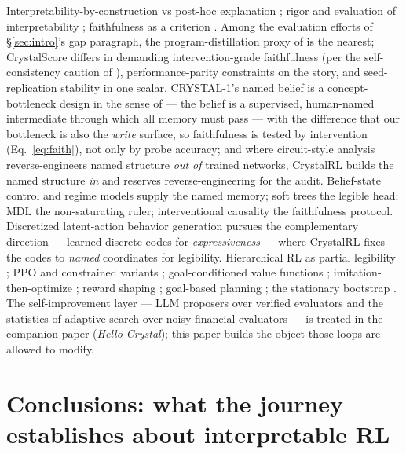 \documentclass[11pt]{article}
\begin{document}
Interpretability-by-construction vs post-hoc explanation \citep{rudin2019,lipton2018}; rigor
and evaluation of interpretability \citep{doshivelez2017,hoffman2018}; faithfulness as a
criterion \citep{jacovi2020}. Among the evaluation efforts of \S\ref{sec:intro}'s gap
paragraph, the program-distillation proxy of \citet{kohler2025} is the nearest; CrystalScore
differs in demanding intervention-grade faithfulness (per the self-consistency caution of
\citealp{parcalabescu2024}), performance-parity constraints on the story, and seed-replication
stability in one scalar. CRYSTAL-1's named belief is a concept-bottleneck design in the
sense of \citet{koh2020} --- the belief is a supervised, human-named intermediate through which
all memory must pass --- with the difference that our bottleneck is also the \emph{write}
surface, so faithfulness is tested by intervention (Eq.~\ref{eq:faith}), not only by probe
accuracy; and where circuit-style analysis \citep{olah2020} reverse-engineers named structure
\emph{out of} trained networks, CrystalRL builds the named structure \emph{in} and reserves
reverse-engineering for the audit. Belief-state control \citep{kaelbling1998} and regime models
\citep{hamilton1989} supply the named memory; soft trees \citep{frosst2017} the legible head;
MDL \citep{rissanen1978} the non-saturating ruler; interventional causality \citep{pearl2009}
the faithfulness protocol. Discretized latent-action behavior generation \citep{lee2024vqbet}
pursues the complementary direction --- learned discrete codes for \emph{expressiveness} ---
where CrystalRL fixes the codes to \emph{named} coordinates for legibility. Hierarchical RL as
partial legibility \citep{sutton1999options,bacon2017option}; PPO and constrained variants
\citep{schulman2017ppo,achiam2017}; goal-conditioned value functions \citep{schaul2015};
imitation-then-optimize \citep{ross2011dagger,rusu2016distillation}; reward shaping
\citep{ng1999shaping}; goal-based planning \citep{das2020goals,browne1999}; the stationary
bootstrap \citep{politis1994}. The self-improvement layer --- LLM proposers over verified
evaluators \citep{romera2024funsearch,novikov2025alphaevolve,ma2023eureka,wang2023voyager} and
the statistics of adaptive search over noisy financial evaluators \citep{baileylopez2014dsr}
--- is treated in the companion paper (\emph{Hello Crystal}); this paper builds the object
those loops are allowed to modify.

\section{Conclusions: what the journey establishes about interpretable RL}
\label{sec:conclusions}
\end{document}
